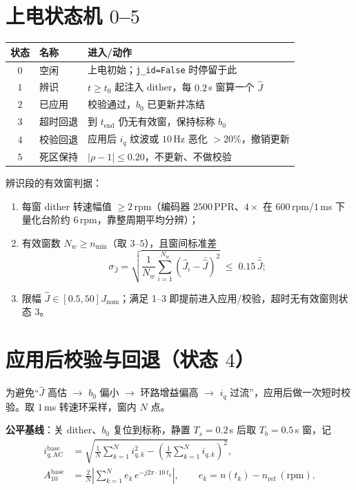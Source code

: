 \documentclass[11pt,a4paper]{article}
\newcommand{\Jnom}{J_{\mathrm{nom}}}
\newcommand{\Jhat}{\hat J}
\newcommand{\bzero}{b_0}
\begin{document}
\section{上电状态机 $0$--$5$}

\begin{center}\footnotesize
\begin{tabular}{@{}clp{9.2cm}@{}}
\toprule
状态 & 名称 & 进入/动作\\
\midrule
$0$ & 空闲 & 上电初始；\texttt{j\_id=False} 时停留于此\\
$1$ & 辨识 & $t\ge t_0$ 起注入 dither，每 $0.2$\,s 窗算一个 $\Jhat$\\
$2$ & 已应用 & 校验通过，$\bzero$ 已更新并冻结\\
$3$ & 超时回退 & 到 $t_{\mathrm{end}}$ 仍无有效窗，保持标称 $\bzero$\\
$4$ & 校验回退 & 应用后 $i_q$ 纹波或 $10$\,Hz 恶化 $>20\%$，撤销更新\\
$5$ & 死区保持 & $|\rho-1|\le0.20$，不更新、不做校验\\
\bottomrule
\end{tabular}
\end{center}

辨识段的有效窗判据：
\begin{enumerate}
  \item 每窗 dither 转速幅值 $\ge2$\,rpm（编码器 $2500$\,PPR、$4\times$ 在 $600$\,rpm/$1$\,ms 下量化台阶约 $6$\,rpm，靠整周期平均分辨）；
  \item 有效窗数 $N_w\ge n_{\min}$（取 $3$--$5$），且窗间标准差
  \begin{equation}
  \sigma_{\Jhat}=\sqrt{\frac{1}{N_w}\sum_{i=1}^{N_w}\left(\Jhat_i-\bar{\Jhat}\right)^2}
  \;\le\;0.15\,\bar{\Jhat};
  \label{eq:std}
  \end{equation}
  \item 限幅 $\Jhat\in[0.5,50]\Jnom$；满足 1--3 即提前进入应用/校验，超时无有效窗则状态 $3$。
\end{enumerate}

\section{应用后校验与回退（状态 $4$）}

为避免“$\Jhat$ 高估 $\to$ $b_0$ 偏小 $\to$ 环路增益偏高 $\to$ $i_q$ 过流”，应用后做一次短时校验。取 $1$\,ms 转速环采样，窗内 $N$ 点。

\textbf{公平基线}：关 dither、$b_0$ 复位到标称，静置 $T_s=0.2$\,s 后取 $T_b=0.5$\,s 窗，记
\begin{align}
i_{q,\mathrm{AC}}^{\mathrm{base}}&=\sqrt{\frac{1}{N}\sum_{k=1}^{N}i_{q,k}^2-\left(\frac{1}{N}\sum_{k=1}^{N}i_{q,k}\right)^2},\label{eq:iqrms}\\
A_{10}^{\mathrm{base}}&=\frac{2}{N}\left|\sum_{k=1}^{N}e_k\,e^{-j2\pi\cdot10\,t_k}\right|,
\qquad e_k=n(t_k)-n_{\mathrm{ref}}\ (\mathrm{rpm}).\label{eq:a10}
\end{align}
\end{document}
